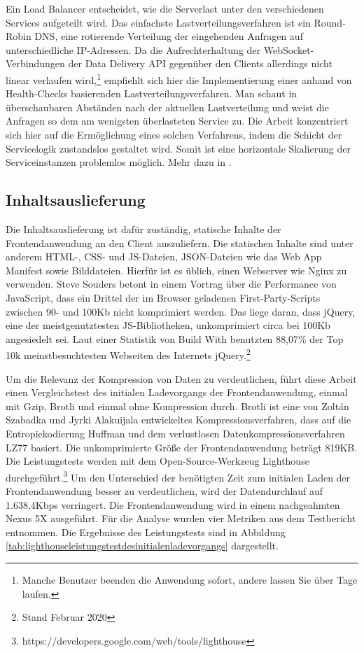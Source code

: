 Ein Load Balancer entscheidet, wie die Serverlast unter den verschiedenen Services aufgeteilt wird.
Das einfachste Lastverteilungsverfahren ist ein Round-Robin DNS, eine rotierende Verteilung
der eingehenden Anfragen auf unterschiedliche IP-Adressen.\cite{CloudflareRoundRobinDNS} 
Da die Aufrechterhaltung der WebSocket-Verbindungen der Data Delivery API gegenüber
den Clients allerdings nicht linear verlaufen wird,\footnote{Manche Benutzer beenden die Anwendung sofort, andere lassen Sie über Tage laufen.}
empfiehlt sich hier die Implementierung einer anhand von Health-Checks basierenden
Lastverteilungsverfahren. Man schaut in überschaubaren Abständen nach der aktuellen
Lastverteilung und weist die Anfragen so dem am wenigsten überlasteten Service zu.
Die Arbeit konzentriert sich hier auf die Ermöglichung eines solchen Verfahrens,
indem die Schicht der Servicelogik zustandslos gestaltet wird. Somit ist eine
horizontale Skalierung der Serviceinstanzen problemlos möglich. Mehr dazu in
.

\subsection{Inhaltsauslieferung}
\label{subsec:inhaltsauslieferung}
Die Inhaltsauslieferung ist dafür zuständig, statische Inhalte der Frontendanwendung
an den Client auszuliefern. Die statischen Inhalte sind unter anderem
HTML-, CSS- und JS-Dateien, JSON-Dateien wie das Web App Manifest sowie Bilddateien.
Hierfür ist es üblich, einen Webserver wie Nginx zu verwenden. Steve Souders betont
in einem Vortrag über die Performance von JavaScript, dass ein Drittel der im Browser
geladenen First-Party-Scripts zwischen 90- und 100Kb nicht komprimiert werden.
Das liege daran, dass jQuery, eine der meistgenutztesten JS-Bibliotheken,
unkomprimiert circa bei 100Kb angesiedelt sei.\cite{SteveSoudersMakeJavaScriptFaster}
Laut einer Statistik von Build With benutzten 88,07\% der Top 10k meinstbesuchtesten
Webseiten des Internets jQuery.\footnote{Stand Februar 2020}\cite{BuildWithjQuery}

Um die Relevanz der Kompression von Daten zu verdeutlichen, führt diese Arbeit einen
Vergleichstest des initialen Ladevorgangs der Frontendanwendung,
einmal mit Gzip, Brotli und einmal ohne Kompression durch. Brotli ist eine
von Zoltán Szabadka und Jyrki Alakuijala entwickeltes Kompressionsverfahren,
dass auf die Entropiekodierung Huffman und dem verlustlosen
Datenkompressionsverfahren LZ77 basiert.\cite{BrotliGoogleOpenSourceBlog}
Die unkomprimierte Größe der Frontendanwendung beträgt 819KB. Die Leistungstests
werden mit dem Open-Source-Werkzeug Lighthouse durchgeführt.\footnote{https://developers.google.com/web/tools/lighthouse}
Um den Unterschied der benötigten Zeit zum initialen Laden der Frontendanwendung
besser zu verdeutlichen, wird der Datendurchlauf auf 1.638,4Kbps verringert.
Die Frontendanwendung wird in einem nachgeahmten Nexus 5X ausgeführt.
Für die Analyse wurden vier Metriken aus dem Testbericht entnommen.
Die Ergebnisse des Leistungstests sind in Abbildung \ref{tab:lighthouseleistungstestdesinitialenladevorgangs}
dargestellt.

